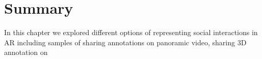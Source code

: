 \section{Summary}

In this chapter we explored different options of representing social interactions in AR including samples of sharing annotations on panoramic video, sharing 3D annotation on 

